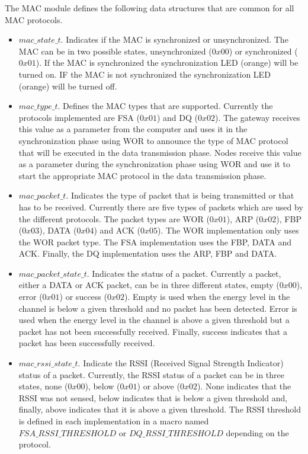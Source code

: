 The MAC module defines the following data structures that are common for all MAC protocols.
\begin{itemize}
\item $mac\_state\_t$. Indicates if the MAC is synchronized or unsynchronized. The MAC can be in two possible states, unsynchronized ($0x00$) or synchronized ($0x01$). If the MAC is synchronized the synchronization LED (orange) will be turned on. IF the MAC is not synchronized the synchronization LED (orange) will be turned off.
\item $mac\_type\_t$. Defines the MAC types that are supported. Currently the protocols implemented are FSA ($0x01$) and DQ ($0x02$). The gateway receives this value as a parameter from the computer and uses it in the synchronization phase using WOR to announce the type of MAC protocol that will be executed in the data transmission phase. Nodes receive this value as a parameter during the synchronization phase using WOR and use it to start the appropriate MAC protocol in the data transmission phase.
\item $mac\_packet\_t$. Indicates the type of packet that is being transmitted or that has to be received. Currently there are five types of packets which are used by the different protocols. The packet types are WOR ($0x01$), ARP ($0x02$), FBP ($0x03$), DATA ($0x04$) and ACK ($0x05$). The WOR implementation only uses the WOR packet type. The FSA implementation uses the FBP, DATA and ACK. Finally, the DQ implementation uses the ARP, FBP and DATA.
\item $mac\_packet\_state\_t$. Indicates the status of a packet. Currently a packet, either a DATA or ACK packet, can be in three different states, empty ($0x00$), error ($0x01$) or success ($0x02$). Empty is used when the energy level in the channel is below a given threshold and no packet has been detected. Error is used when the energy level in the channel is above a given threshold but a packet has not been successfully received. Finally, success indicates that a packet has been successfully received.
\item $mac\_rssi\_state\_t$. Indicate the RSSI (Received Signal Strength Indicator) status of a packet. Currently, the RSSI status of a packet can be in three states, none ($0x00$), below ($0x01$) or above ($0x02$). None indicates that the RSSI was not sensed, below indicates that is below a given threshold and, finally, above indicates that it is above a given threshold. The RSSI threshold is defined in each implementation in a macro named $FSA\_RSSI\_THRESHOLD$ or $DQ\_RSSI\_THRESHOLD$ depending on the protocol.
\end{itemize}

